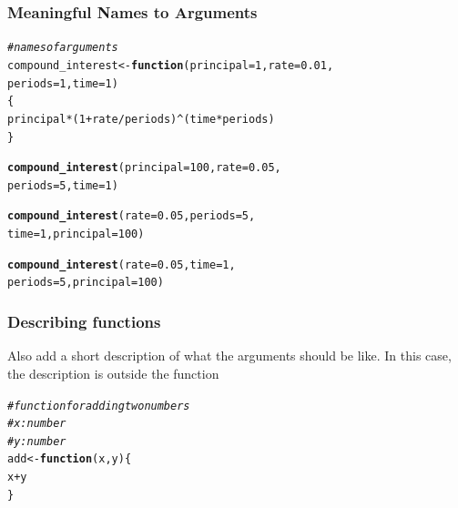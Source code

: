 \documentclass[12pt]{beamer}\usepackage[]{graphicx}\usepackage[]{color}
\makeatletter
\newcommand{\hlnum}[1]{\textcolor[rgb]{0.686,0.059,0.569}{#1}}%
\newcommand{\hlcom}[1]{\textcolor[rgb]{0.678,0.584,0.686}{\textit{#1}}}%
\newcommand{\hlopt}[1]{\textcolor[rgb]{0,0,0}{#1}}%
\newcommand{\hlstd}[1]{\textcolor[rgb]{0.345,0.345,0.345}{#1}}%
\newcommand{\hlkwa}[1]{\textcolor[rgb]{0.161,0.373,0.58}{\textbf{#1}}}%
\newcommand{\hlkwb}[1]{\textcolor[rgb]{0.69,0.353,0.396}{#1}}%
\newcommand{\hlkwc}[1]{\textcolor[rgb]{0.333,0.667,0.333}{#1}}%
\newcommand{\hlkwd}[1]{\textcolor[rgb]{0.737,0.353,0.396}{\textbf{#1}}}%
\newenvironment{kframe}{%
 \def\at@end@of@kframe{}%
 \ifinner\ifhmode%
  \def\at@end@of@kframe{\end{minipage}}%
  \begin{minipage}{\columnwidth}%
 \fi\fi%
 \def\FrameCommand##1{\hskip\@totalleftmargin \hskip-\fboxsep
 \colorbox{shadecolor}{##1}\hskip-\fboxsep
     \hskip-\linewidth \hskip-\@totalleftmargin \hskip\columnwidth}%
 \MakeFramed {\advance\hsize-\width
   \@totalleftmargin\z@ \linewidth\hsize
   \@setminipage}}%
 {\par\unskip\endMakeFramed%
 \at@end@of@kframe}
\newenvironment{knitrout}{}{} %
\makeatother
\begin{document}

\begin{frame}[fragile]
\frametitle{Meaningful Names to Arguments}

\begin{knitrout}\scriptsize
{}\color{fgcolor}\begin{kframe}
\begin{alltt}
\hlcom{# names of arguments}
\hlstd{compound_interest} \hlkwb{<-} \hlkwa{function}\hlstd{(}\hlkwc{principal} \hlstd{=} \hlnum{1}\hlstd{,} \hlkwc{rate} \hlstd{=} \hlnum{0.01}\hlstd{,}
                              \hlkwc{periods} \hlstd{=} \hlnum{1}\hlstd{,} \hlkwc{time} \hlstd{=} \hlnum{1}\hlstd{)}
\hlstd{\{}
  \hlstd{principal} \hlopt{*} \hlstd{(}\hlnum{1} \hlopt{+} \hlstd{rate}\hlopt{/}\hlstd{periods)}\hlopt{^}\hlstd{(time} \hlopt{*} \hlstd{periods)}
\hlstd{\}}

\hlkwd{compound_interest}\hlstd{(}\hlkwc{principal} \hlstd{=} \hlnum{100}\hlstd{,} \hlkwc{rate} \hlstd{=} \hlnum{0.05}\hlstd{,}
                  \hlkwc{periods} \hlstd{=} \hlnum{5}\hlstd{,} \hlkwc{time} \hlstd{=} \hlnum{1}\hlstd{)}

\hlkwd{compound_interest}\hlstd{(}\hlkwc{rate} \hlstd{=} \hlnum{0.05}\hlstd{,} \hlkwc{periods} \hlstd{=} \hlnum{5}\hlstd{,}
                  \hlkwc{time} \hlstd{=} \hlnum{1}\hlstd{,} \hlkwc{principal} \hlstd{=} \hlnum{100}\hlstd{)}

\hlkwd{compound_interest}\hlstd{(}\hlkwc{rate} \hlstd{=} \hlnum{0.05}\hlstd{,} \hlkwc{time} \hlstd{=} \hlnum{1}\hlstd{,}
                  \hlkwc{periods} \hlstd{=} \hlnum{5}\hlstd{,} \hlkwc{principal} \hlstd{=} \hlnum{100}\hlstd{)}
\end{alltt}
\end{kframe}
\end{knitrout}

\end{frame}



\begin{frame}[fragile]
\frametitle{Describing functions}

Also add a short description of what the arguments should be like. In this case, the description is outside the function
\begin{knitrout}\footnotesize
{}\color{fgcolor}\begin{kframe}
\begin{alltt}
\hlcom{# function for adding two numbers}
\hlcom{# x: number}
\hlcom{# y: number}
\hlstd{add} \hlkwb{<-} \hlkwa{function}\hlstd{(}\hlkwc{x}\hlstd{,} \hlkwc{y}\hlstd{) \{}
  \hlstd{x} \hlopt{+} \hlstd{y}
\hlstd{\}}
\end{alltt}
\end{kframe}
\end{knitrout}

\end{frame}
\end{document}
